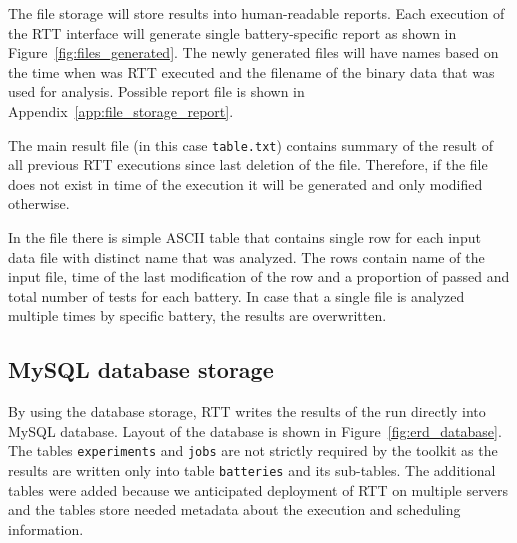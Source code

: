 \documentclass[
  digital,  	%
  color,		%
  oneside,   	%
  12pt,
  nocover,
  notable,
  nolof,
  nolot,
]{fithesis3}
\begin{document}
\noindent
The file storage will store results into human-readable reports. Each execution of the RTT interface will generate single battery-specific report as shown in Figure~\ref{fig:files_generated}. The newly generated files will have names based on the time when was RTT executed and the filename of the binary data that was used for analysis. Possible report file is shown in Appendix~\ref{app:file_storage_report}.

The main result file (in this case \texttt{table.txt}) contains summary of the result of all previous RTT executions since last deletion of the file. Therefore, if the file does not exist in time of the execution it will be generated and only modified otherwise. 

In the file there is simple ASCII table that contains single row for each input data file with distinct name that was analyzed. The rows contain name of the input file, time of the last modification of the row and a proportion of passed and total number of tests for each battery. In case that a single file is analyzed multiple times by specific battery, the results are overwritten.

\subsection{MySQL database storage}
By using the database storage, RTT writes the results of the run directly into MySQL database. Layout of the database is shown in Figure~\ref{fig:erd_database}. The tables \texttt{experiments} and \texttt{jobs} are not strictly required by the toolkit as the results are written only into table \texttt{batteries} and its sub-tables. The additional tables were added because we anticipated deployment of RTT on multiple servers and the tables store needed metadata about the execution and scheduling information.
\end{document}
